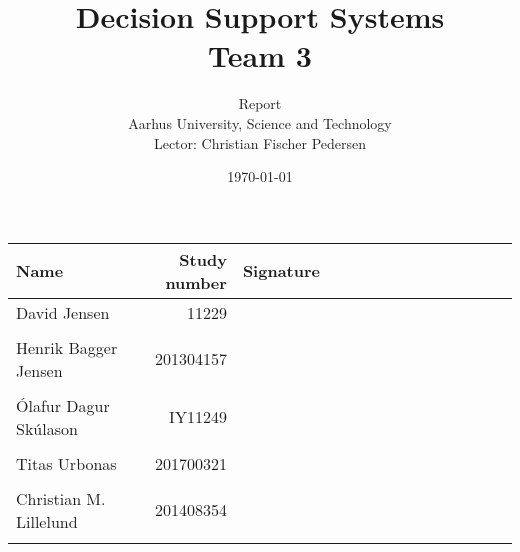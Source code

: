 \documentclass[a4paper,11pt,oneside]{memoir}
\title{Decision Support Systems \\ Team 3}
\author{Report \\ Aarhus University, Science and Technology \\ Lector: Christian Fischer Pedersen}
\date{\today}
\begin{document}
\fancyhf{} %
\frontmatter
\maketitle
\vfill


\begin{table} [h]
	\centering
	\begin{tabular}{|l|r|l|}
	\hline 
	\textbf{Name} 				& \textbf{Study number} & \textbf{Signature~~~~~~~~~~~~~~~~~~~~} 	\\ \hline
	David Jensen 				& 11229 	& \\ && 												\\ \hline
	Henrik Bagger Jensen 		& 201304157 & \\ && 												\\ \hline
	Ólafur Dagur Skúlason 		& IY11249	& \\ && 												\\ \hline
	Titas Urbonas 				& 201700321 & \\ && 												\\ \hline
	Christian M. Lillelund 		& 201408354 & \\ && 												\\ \hline
	\end{tabular}
\end{table}

\clearpage
\pagestyle{plain}

\tableofcontents

\vfill

\mainmatter
\pagestyle{fancy}
\fancyhf{} %
\fancyhead[C]{\nouppercase{\leftmark}}
\fancyfoot[C]{\nouppercase{\rightmark}}
\fancyfoot[R]{\thepage}

								    \clearpage
										\clearpage
					\clearpage
						\clearpage
							\clearpage
							\clearpage
						\clearpage
								        \clearpage
										\clearpage
									\clearpage
									\clearpage

\end{document}

